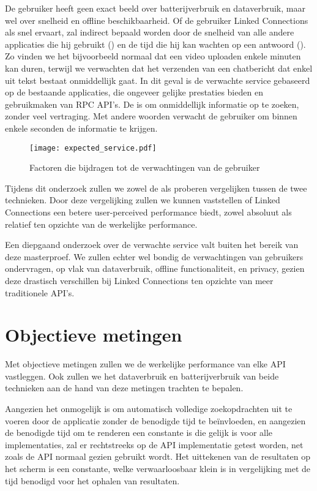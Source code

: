 De gebruiker heeft geen exact beeld over batterijverbruik en dataverbruik, maar wel over snelheid en offline beschikbaarheid. Of de gebruiker Linked Connections als snel ervaart, zal indirect bepaald worden door de snelheid van alle andere applicaties die hij gebruikt () en de tijd die hij kan wachten op een antwoord (). Zo vinden we het bijvoorbeeld normaal dat een video uploaden enkele minuten kan duren, terwijl we verwachten dat het verzenden van een chatbericht dat enkel uit tekst bestaat onmiddellijk gaat. In dit geval is de verwachte service gebaseerd op de bestaande applicaties, die ongeveer gelijke prestaties bieden en gebruikmaken van RPC API's. De  is om onmiddellijk informatie op te zoeken, zonder veel vertraging. Met andere woorden verwacht de gebruiker om binnen enkele seconden de informatie te krijgen.

\begin{figure}[h]
	\centering
	\texttt{[image: expected\_service.pdf]}
	\caption[Factoren die bijdragen tot de verwachtingen van de gebruiker]{Factoren die bijdragen tot de verwachtingen van de gebruiker}
	\label{fig:expectedserviceperceivedservice}
\end{figure}

Tijdens dit onderzoek zullen we zowel de  als  proberen vergelijken tussen de twee technieken. Door deze vergelijking zullen we kunnen vaststellen of Linked Connections een betere user-perceived performance biedt, zowel absoluut als relatief ten opzichte van de werkelijke performance.

Een diepgaand onderzoek over de verwachte service valt buiten het bereik van deze masterproef. We zullen echter wel bondig de verwachtingen van gebruikers ondervragen, op vlak van dataverbruik, offline functionaliteit, en privacy, gezien deze drastisch verschillen bij Linked Connections ten opzichte van meer traditionele API's.

\section{Objectieve metingen}

Met objectieve metingen zullen we de werkelijke performance van elke API vastleggen. Ook zullen we het dataverbruik en batterijverbruik van beide technieken aan de hand van deze metingen trachten te bepalen.

Aangezien het onmogelijk is om automatisch volledige zoekopdrachten uit te voeren door de applicatie zonder de benodigde tijd te beïnvloeden, en aangezien de benodigde tijd om te renderen een constante is die gelijk is voor alle implementaties, zal er rechtstreeks op de API implementatie getest worden, net zoals de API normaal gezien gebruikt wordt. Het uittekenen van de resultaten op het scherm is een constante, welke verwaarloosbaar klein is in vergelijking met de tijd benodigd voor het ophalen van resultaten.

